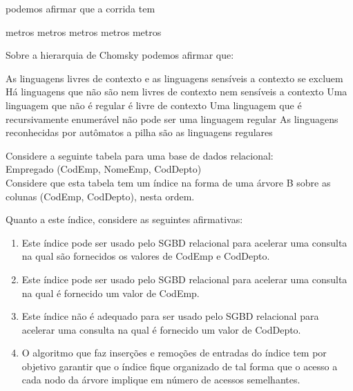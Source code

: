 \documentclass[12pt, addpoints]{exam}
\begin{document}
\begin{questions}
\begin{itemize}
\end{itemize}



podemos afirmar que a corrida tem
\begin{choices}
 metros
 metros
 metros
 metros
 metros
\end{choices}

\question

Sobre a hierarquia de Chomsky podemos afirmar que:
\begin{choices}
\choice As linguagens livres de contexto e as linguagens sensíveis a contexto se excluem
\choice Há linguagens que não são nem livres de contexto nem sensíveis a contexto
\choice Uma linguagem que não é regular é livre de contexto
\choice Uma linguagem que é recursivamente enumerável não pode ser uma linguagem regular
\choice As linguagens reconhecidas por autômatos a pilha são as linguagens regulares
\end{choices}

\question

Considere a seguinte tabela para uma base de dados relacional:\\

Empregado (CodEmp, NomeEmp, CodDepto)\\

Considere que esta tabela tem um índice na forma de uma árvore B sobre as colunas (CodEmp, CodDepto), nesta ordem.

Quanto a este índice, considere as seguintes afirmativas:

\begin{enumerate}

    \item Este índice pode ser usado pelo SGBD relacional para acelerar uma consulta na qual são fornecidos os valores de CodEmp e CodDepto.

    \item Este índice pode ser usado pelo SGBD relacional para acelerar uma consulta na qual é fornecido um valor de CodEmp.

    \item Este índice não é adequado para ser usado pelo SGBD relacional para acelerar uma consulta na qual é fornecido um valor de CodDepto.

    \item O algoritmo que faz inserções e remoções de entradas do índice tem por objetivo garantir que o índice fique organizado de tal forma que o acesso a cada nodo da árvore implique em número de acessos semelhantes.


\end{enumerate}
\end{questions}
\end{document}
